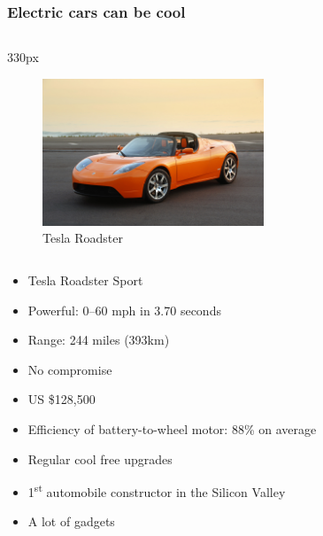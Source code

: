 {
\logo{}
\begin{frame}
\frametitle{Electric cars can be cool}
\begin{center}
\begin{columns}
\begin{column}{330px}
{
    \begin{figure}[h!]
        \centering
        \includegraphics[width=250px]
            {images/tesla-roadster.jpg}
        \caption{Tesla Roadster}
    \end{figure}
}
\end{column}
\end{columns}
\end{center}
\end{frame}
}

\begin{frame}
\begin{itemize}
    \itemsep1.5em
    \item Tesla Roadster Sport
    \item Powerful: 0--60 mph in 3.70 seconds
    \item Range: 244 miles (393km)
    \item No compromise
    \item US \$128,500
\end{itemize}
\end{frame}

\begin{frame}
\begin{itemize}
    \itemsep1.5em
    \item Efficiency of battery-to-wheel motor: 88\% on average
    \item Regular cool free upgrades
    \item 1\textsuperscript{st} automobile constructor in the Silicon Valley
    \item A lot of gadgets
\end{itemize}
\end{frame}

